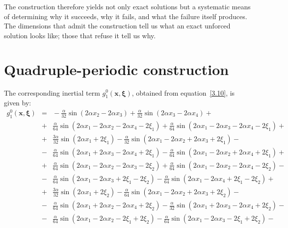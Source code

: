 \documentclass[11pt]{jfm}
\newif\iffullAppendixA
\numberwithin{equation}{section}
\begin{document}
The construction therefore yields not only exact solutions but a systematic means of determining
why it succeeds, why it fails, and what the failure itself produces. The dimensions that admit the construction tell us what an exact unforced solution
looks like; those that refuse it tell us why.

\appendix
\section{Quadruple-periodic construction}
\label{app:4D}
\iffullAppendixA
The corresponding inertial term \( g_1^0(\boldsymbol{x}, \boldsymbol{\xi}) \), obtained from equation~\eqref{3.10}, is given by:
\begin{eqnarray}
\label{A1}
g_1^0(\boldsymbol{x}, \boldsymbol{\xi}) &=&\!-\!\frac{\alpha}{32} \sin(2\alpha x_2 \!-\! 2\alpha x_3)\!+\! \frac{\alpha}{32} \sin(2\alpha x_3 \!-\! 2\alpha x_4)\!+\! \nonumber\\
&\!+\!& \frac{\alpha}{64} \sin(2\alpha x_1 \!-\! 2\alpha x_2 \!-\! 2\alpha x_4 \!-\! 2\xi_1) \!+\! \frac{\alpha}{64} \sin(2\alpha x_1 \!-\! 2\alpha x_3 \!-\! 2\alpha x_4 \!-\! 2\xi_1)\!+\! \nonumber\\
&\!+\!& \frac{3\alpha}{32} \sin(2\alpha x_1 \!+\! 2\xi_1) \!-\! \frac{\alpha}{32} \sin(2\alpha x_1 \!-\! 2\alpha x_2 \!+\! 2\alpha x_3 \!+\! 2\xi_1)\!-\! \nonumber\\
&\!-\!& \frac{\alpha}{64} \sin(2\alpha x_1 \!+\! 2\alpha x_3 \!-\! 2\alpha x_4 \!+\! 2\xi_1)\!-\! \frac{\alpha}{64} \sin(2\alpha x_1 \!-\! 2\alpha x_2 \!+\! 2\alpha x_4 \!+\! 2\xi_1)\!+\!\nonumber\\
&\!+\!& \frac{\alpha}{64} \sin(2\alpha x_1 \!-\! 2\alpha x_2 \!-\! 2\alpha x_3 \!-\! 2\xi_2) \!+\! \frac{\alpha}{64} \sin(2\alpha x_1 \!-\! 2\alpha x_2 \!-\! 2\alpha x_4 \!-\! 2\xi_2)\!-\!\nonumber\\
&\!-\!& \frac{\alpha}{64} \sin(2\alpha x_1 \!-\! 2\alpha x_3 \!+\! 2\xi_1 \!-\! 2\xi_2)\!-\! \frac{\alpha}{64} \sin(2\alpha x_1 \!-\! 2\alpha x_4 \!+\! 2\xi_1 \!-\! 2\xi_2)\!+\! \nonumber\\
&\!+\!& \frac{3\alpha}{32} \sin(2\alpha x_1 \!+\! 2\xi_2)\!-\! \frac{\alpha}{64} \sin(2\alpha x_1 \!-\! 2\alpha x_2 \!+\! 2\alpha x_3 \!+\! 2\xi_2)\!-\!\nonumber\\
&\!-\! &\frac{\alpha}{64} \sin(2\alpha x_1 \!+\! 2\alpha x_2 \!-\! 2\alpha x_4 \!+\! 2\xi_2)\!-\! \frac{\alpha}{32} \sin(2\alpha x_1 \!+\! 2\alpha x_3 \!-\! 2\alpha x_4 \!+\! 2\xi_2)\!-\!\nonumber\\
&\!-\! &\frac{\alpha}{64} \sin(2\alpha x_1 \!-\! 2\alpha x_2 \!-\! 2\xi_1 \!+\! 2\xi_2)\!-\! \frac{\alpha}{64} \sin(2\alpha x_1 \!-\! 2\alpha x_3 \!-\! 2\xi_1 \!+\! 2\xi_2)\!-\! \nonumber\\

\end{eqnarray}
\end{document}
